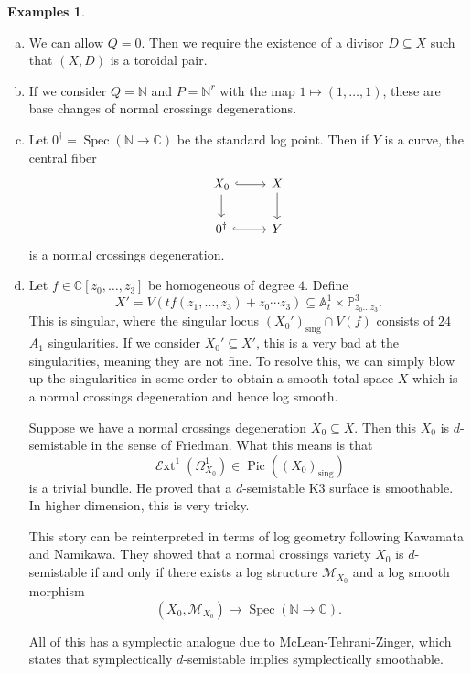 \documentclass[leqno, openany]{memoir}
\theoremstyle{definition}
\newtheorem{exms}[thm]{Examples}
\theoremstyle{remark}
\theoremstyle{plain}
\theoremstyle{definition}
\theoremstyle{remark}
\newcommand{\A}{\mathbb{A}}
\newcommand{\N}{\mathbb{N}}
\newcommand{\C}{\mathbb{C}}
\renewcommand{\P}{\mathbb{P}}
\newcommand{\mc}[1]{\mathcal{#1}}
\newcommand{\mr}[1]{\mathrm{#1}}
\newcommand{\on}[1]{\operatorname{#1}}
\DeclareMathOperator{\Pic}{Pic}
\DeclareMathOperator{\Spec}{Spec}
\begin{document}
\begin{exms}\leavevmode
\begin{enumerate}[(a)]
\item We can allow $Q = 0$. Then we require the existence of a divisor $D \subseteq X$ such that $(X, D)$ is a toroidal pair.
\item If we consider $Q = \N$ and $P = \N^r$ with the map $1 \mapsto (1, \ldots, 1)$, these are base changes of normal crossings degenerations.
\item Let $0^{\dag} = \Spec (\N \to \C)$ be the standard log point. Then if $Y$ is a curve, the central fiber
  \begin{equation*}
    \begin{tikzcd}
      X_0 \ar[hookrightarrow]{r} \ar{d} & X \ar{d} \\
      0^{\dag} \ar[hookrightarrow]{r} & Y
    \end{tikzcd}
  \end{equation*}
  is a normal crossings degeneration.
\item Let $f \in \C[z_0, \ldots, z_3]$ be homogeneous of degree $4$. Define
  \[ X' = V(tf(z_1, \ldots, z_3) + z_0 \cdots z_3) \subseteq \A^1_t \times \P^3_{z_0 \ldots z_3}. \]
  This is singular, where the singular locus $(X_0')_{\mr{sing}} \cap V(f)$ consists of $24$ $A_1$ singularities. If we consider $X_0' \subseteq X'$, this is a very bad at the singularities, meaning they are not fine. To resolve this, we can simply blow up the singularities in some order to obtain a smooth total space $X$ which is a normal crossings degeneration and hence log smooth.

  Suppose we have a normal crossings degeneration $X_0 \subseteq X$. Then this $X_0$ is $d$-semistable in the sense of Friedman. What this means is that
  \[ \on{\mc{E}xt}^1(\Omega^1_{X_0}) \in \Pic((X_0)_{\mr{sing}}) \]
  is a trivial bundle. He proved that a $d$-semistable K3 surface is smoothable. In higher dimension, this is very tricky.

  This story can be reinterpreted in terms of log geometry following Kawamata and Namikawa. They showed that a normal crossings variety $X_0$ is $d$-semistable if and only if there exists a log structure $\mc{M}_{X_0}$ and a log smooth morphism
  \[ (X_0, \mc{M}_{X_0}) \to \Spec (\N \to \C). \]

  All of this has a symplectic analogue due to McLean-Tehrani-Zinger, which states that symplectically $d$-semistable implies symplectically smoothable.
\end{enumerate}
\end{exms}
\end{document}
